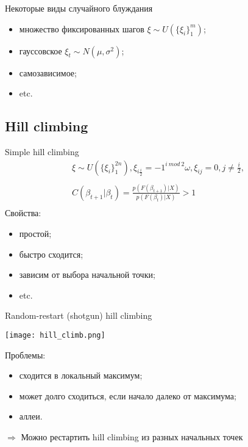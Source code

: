 \documentclass[14pt, fleqn, xcolor={dvipsnames, table}]{beamer}
\begin{document}
\begin{frame}{Некоторые виды случайного блуждания}
\begin{itemize}
  \item множество фиксированных шагов $\xi \sim U(\{\xi_i\}_1^m)$;
  \item гауссовское $\xi_t \sim N(\mu, \sigma^2)$;
  \item самозависимое;
  \item etc.
\end{itemize}
\end{frame}

\subsection{Hill climbing}
\begin{frame}{Simple hill climbing}
$$\begin{array}{l}
\xi \sim U(\{\xi_i\}_1^{2n}), \xi_{i\frac{i}{2}} = -1^{i~mod~2}\omega, \xi_{ij} = 0, j \neq \frac{i}{2},\\
\\
C(\beta_{t+1}|\beta_t) = \frac{p(F(\beta_{t+1})|X)}{p(F(\beta_t)|X)} > 1 \\
\end{array}$$
Свойства:
\begin{itemize}
  \item простой;
  \item быстро сходится;
  \item зависим от выбора начальной точки;
  \item etc.
\end{itemize}
\end{frame}

\begin{frame}{Random-restart (shotgun) hill climbing}
\begin{center}
\texttt{[image: hill\_climb.png]}
\end{center}
\footnotesize
Проблемы:
\begin{itemize}
  \item сходится в локальный максимум;
  \item может долго сходиться, если начало далеко от максимума;
  \item аллеи.
\end{itemize}
$\Rightarrow$ Можно рестартить hill climbing из разных начальных точек
\end{frame}
\end{document}
